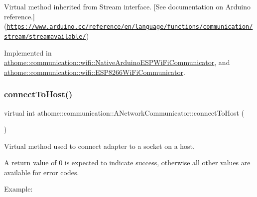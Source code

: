 Virtual method inherited from Stream interface. \mbox{[}See documentation on Arduino reference.\mbox{]}(\href{https://www.arduino.cc/reference/en/language/functions/communication/stream/streamavailable/}{\tt https\+://www.\+arduino.\+cc/reference/en/language/functions/communication/stream/streamavailable/}) 

Implemented in \mbox{\hyperlink{classathome_1_1communication_1_1wifi_1_1_native_arduino_e_s_p_wi_fi_communicator_a6cd3fe64efeb1085c7e6dc71a740a24b}{athome\+::communication\+::wifi\+::\+Native\+Arduino\+E\+S\+P\+Wi\+Fi\+Communicator}}, and \mbox{\hyperlink{classathome_1_1communication_1_1wifi_1_1_e_s_p8266_wi_fi_communicator_af9b1e28910959893748763faaa5373a0}{athome\+::communication\+::wifi\+::\+E\+S\+P8266\+Wi\+Fi\+Communicator}}.

\mbox{\label{classathome_1_1communication_1_1_a_network_communicator_a370176dae8f38225446e83a132dbcff7}} 
\subsubsection{\texorpdfstring{connect\+To\+Host()}{connectToHost()}}
{\footnotesize\ttfamily virtual int athome\+::communication\+::\+A\+Network\+Communicator\+::connect\+To\+Host (\begin{DoxyParamCaption}{ }\end{DoxyParamCaption})\hspace{0.3cm}{\ttfamily [pure virtual]}}

Virtual method used to connect adapter to a socket on a host.

A return value of 0 is expected to indicate success, otherwise all other values are available for error codes.

Example\+:


